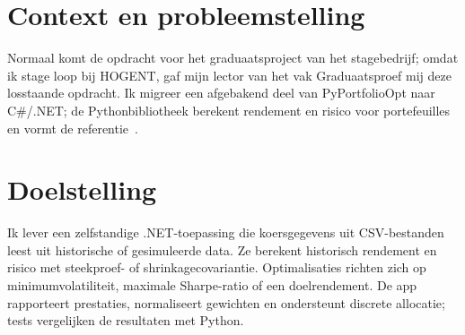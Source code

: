 

\section{Context en probleemstelling}%
\label{vst:context}


Normaal komt de opdracht voor het graduaatsproject van het stagebedrijf; omdat
ik stage loop bij HOGENT, gaf mijn lector van het vak Graduaatsproef mij deze
losstaande opdracht. Ik migreer een afgebakend deel van PyPortfolioOpt naar
C\#/.NET; de Pythonbibliotheek berekent rendement en risico voor portefeuilles
en vormt de referentie~\autocite{PyPortfolioOptDocs}.


\section{Doelstelling}%
\label{vst:doelstelling}


Ik lever een zelfstandige .NET-toepassing die koersgegevens uit CSV-bestanden
leest uit historische of gesimuleerde data. Ze berekent historisch rendement
en risico met steekproef- of shrinkagecovariantie. Optimalisaties richten zich
op minimumvolatiliteit, maximale Sharpe-ratio of een doelrendement. De app
rapporteert prestaties, normaliseert gewichten en ondersteunt discrete
allocatie; tests vergelijken de resultaten met Python.

